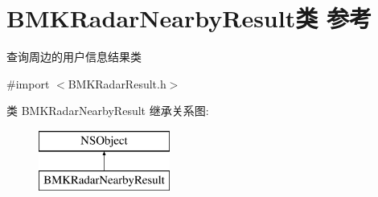 \hypertarget{interface_b_m_k_radar_nearby_result}{}\section{B\+M\+K\+Radar\+Nearby\+Result类 参考}
\label{interface_b_m_k_radar_nearby_result}


查询周边的用户信息结果类  




{\ttfamily \#import $<$B\+M\+K\+Radar\+Result.\+h$>$}

类 B\+M\+K\+Radar\+Nearby\+Result 继承关系图\+:\begin{figure}[H]
\begin{center}
\leavevmode
\includegraphics[height=2.000000cm]{interface_b_m_k_radar_nearby_result}
\end{center}
\end{figure}
